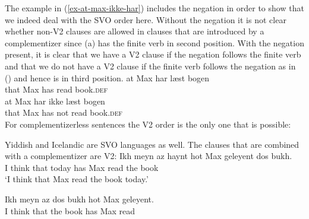 \eal
{}
\zl
The example in (\ref{ex-at-max-ikke-har}) includes the negation in order to show that we indeed deal
with the SVO order here. Without the negation it is not clear whether non-V2 clauses are allowed in
clauses that are introduced by a complementizer since (a) has the finite verb in second
position. With the negation present, it is clear that we have a V2 clause if the negation follows
the finite verb and that we do not have a V2 clause if the finite verb follows the negation as in
() and hence is in third position.
\eal
\settowidth{}
\ex 
\gll at Max har læst bogen\\
     that Max has read book.\textsc{def}\\
\ex 
\gll at Max har ikke læst bogen\\
     that Max has not read book.\textsc{def}\\
\zl 
For complementizerless sentences the V2 order is the only one that is possible:
\eal
\settowidth{}
\zl 


Yiddish and Icelandic are SVO languages as well. The clauses that are combined with a
complementizer are V2:
\eal
\ex
\gll Ikh meyn  az   haynt hot Max geleyent dos bukh.\footnotemark\\
     I think that today has Max read the book\\\yiddish
{}
\glt `I think that Max read the book today.'

\ex%
\gll Ikh meyn  az   dos bukh hot Max geleyent.\\
     I think that the book has Max read\\

\zl
{}


